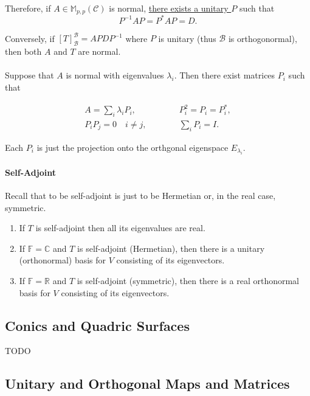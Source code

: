 Therefore, if \( A \in \mathbb{M}_{p, p}(\mathcal{C}) \) is normal,
\underline{there exists a unitary \( P \)} such that \[
    P^{-1} A P = P^* A P = D.
\]

Conversely, if \( {[T]}_{\mathcal{B}}^{\mathcal{B}} = A  PDP^{-1} \)
where \( P \) is unitary (thus \( \mathcal{B} \) is orthogonormal),
then both \( A \) and \( T \) are normal.

\paragraph{}
Suppose that \( A \) is normal with eigenvalues \( \lambda_i \).
Then there exist matrices \( P_i \) such that

\begin{align*}
    A = \sum_{i} \lambda_i P_i, &\quad\quad\quad P^2_i = P_i = P_i^*,   \\
    P_i P_j = 0 \quad i \neq j, &\quad\quad\quad \sum_{i} P_i = I.
\end{align*}

Each \( P_i \) is just the projection onto the orthgonal eigenspace \( E_{\lambda_i} \).

\paragraph{Self-Adjoint}
Recall that to be self-adjoint is just to be Hermetian or, in the real
case, symmetric.
\begin{enumerate}
    \item If \( T \) is self-adjoint then all its eigenvalues are real.
    \item If \( \mathbb{F} = \mathbb{C} \) and \( T \) is self-adjoint (Hermetian),
        then there is a unitary (orthonormal) basis for \( V \) 
        consisting of its eigenvectors.
    \item If \( \mathbb{F} = \mathbb{R} \) and \( T \) is self-adjoint (symmetric),
        then there is a real orthonormal basis for \( V \) consisting of its
        eigenvectors.
\end{enumerate}

%
%
%
\subsection{Conics and Quadric Surfaces}
TODO

%
%
%
\subsection{Unitary and Orthogonal Maps and Matrices}

